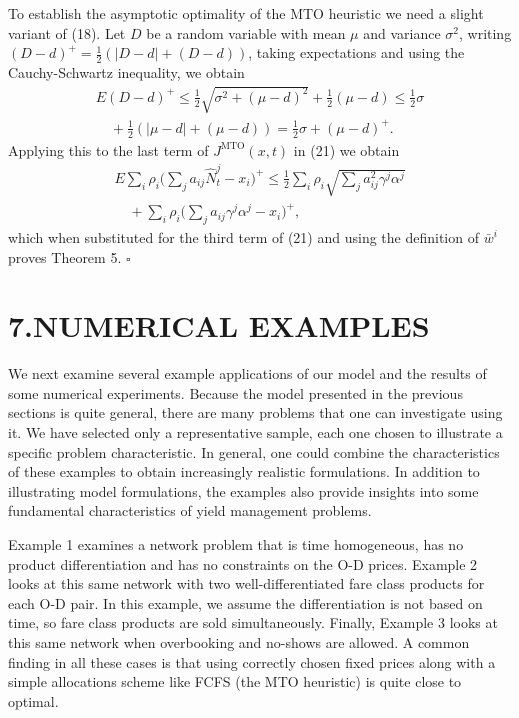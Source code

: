 To establish the asymptotic optimality of the MTO heuristic we need a slight variant of (18). Let \(D\) be a random variable with mean \(\mu\) and variance \(\sigma^{2}\), writing \((D - d)^{+} = \frac{1}{2} ( |D - d| + (D - d) )\), taking expectations and using the Cauchy-Schwartz inequality, we obtain
\[
\begin{array}{l}
\displaystyle E (D - d)^{+} \leqslant \frac{1}{2} \sqrt{\sigma^{2} + (\mu - d)^{2}} + \frac{1}{2} (\mu - d) \leqslant \frac{1}{2} \sigma \\
\displaystyle \quad + \frac{1}{2} (|\mu - d| + (\mu - d)) = \frac{1}{2} \sigma + (\mu - d)^{+} .
\end{array}
\]
Applying this to the last term of \(J^{\mathrm{MTO}} (x, t)\) in (21) we obtain
\[
\begin{array}{l}
\displaystyle E \sum_{i} \rho_i \Big( \sum_{j} a_{ij} \hat{N}_t^{j} - x_i \Big)^{+} \leqslant \frac{1}{2} \sum_{i} \rho_i \sqrt{ \sum_{j} a_{ij}^{2} \gamma^{j} \alpha^{j} } \\
\displaystyle \quad + \sum_{i} \rho_i \Big( \sum_{j} a_{ij} \gamma^{j} \alpha^{j} - x_i \Big)^{+} ,
\end{array}
\]
which when substituted for the third term of (21) and using the definition of \(\bar{w}^{i}\) proves Theorem 5. \(\square\)

\section{7.NUMERICAL EXAMPLES}\label{numerical-examples}

We next examine several example applications of our model and the results of some numerical experiments. Because the model presented in the previous sections is quite general, there are many problems that one can investigate using it. We have selected only a representative sample, each one chosen to illustrate a specific problem characteristic. In general, one could combine the characteristics of these examples to obtain increasingly realistic formulations. In addition to illustrating model formulations, the examples also provide insights into some fundamental characteristics of yield management problems.

Example 1 examines a network problem that is time homogeneous, has no product differentiation and has no constraints on the O-D prices. Example 2 looks at this same network with two well-differentiated fare class products for each O-D pair. In this example, we assume the differentiation is not based on time, so fare class products are sold simultaneously. Finally, Example 3 looks at this same network when overbooking and no-shows are allowed. A common finding in all these cases is that using correctly chosen fixed prices along with a simple allocations scheme like FCFS (the MTO heuristic) is quite close to optimal.

